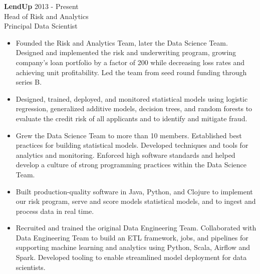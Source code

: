\documentclass[9pt]{article}
\newenvironment{changemargin}[2]{%
  \begin{list}{}{%
    \setlength{\topsep}{0pt}%
    \setlength{\leftmargin}{#1}%
    \setlength{\rightmargin}{#2}%
    \setlength{\listparindent}{\parindent}%
    \setlength{\itemindent}{\parindent}%
    \setlength{\parsep}{\parskip}%
  }%
  \item[]}{\end{list}
}
\newenvironment{body} {
  \vspace*{-16pt}
\begin{changemargin}{-0.25in}{-0.5in}
  }
{\end{changemargin}
}
\begin{document}
\begin{body}

  \vspace{14pt}

  \textbf{LendUp} \hfill 2013 - Present \\
  Head of Risk and Analytics \\
  Principal Data Scientist
  \begin{itemize}


    \item Founded the Risk and Analytics Team, later the Data Science Team.  Designed and implemented the risk and underwriting program, growing company's loan portfolio by a factor of 200 while decreasing loss rates and achieving unit profitability.  Led the team from seed round funding through series B. \\

    \item Designed, trained, deployed, and monitored statistical models using logistic regression, generalized additive models, decision trees, and random forests to evaluate the credit risk of all applicants and to identify and mitigate fraud. \\

    \item Grew the Data Science Team to more than 10 members. Established best practices for building statistical models.  Developed techniques and tools for analytics and monitoring.  Enforced high software standards and helped develop a culture of strong programming practices within the Data Science Team. \\

    \item Built production-quality software in Java, Python, and Clojure to implement our risk program, serve and score models statistical models, and to ingest and process data in real time. \\

    \item Recruited and trained the original Data Engineering Team.  Collaborated with Data Engineering Team to build an ETL framework, jobs, and pipelines for supporting machine learning and analytics using Python, Scala, Airflow and Spark.  Developed tooling to enable streamlined model deployment for data scientists. \\
  \end{itemize}


\end{body}
\end{document}
